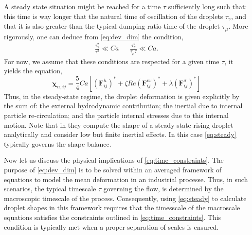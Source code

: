 A steady state situation might be reached for a time $\tau$ sufficiently long such that: this time is way longer that the natural time of oscillation of the droplets $\tau_\gamma$, and that it is also greater than the typical dumping ratio time of the droplet $\tau_\mu$. 
More rigorously, one can deduce from \ref{eq:dev_dim} the condition,
\begin{align}
    \frac{\tau_\gamma^2}{\tau^2}\ll Ca
    && \frac{\tau_\gamma^2}{\tau_\mu \tau}\ll Ca. 
    \label{eq:time_constraints}
\end{align}
For now, we assume that these conditions are respected for a given time $\tau$, it yields the equation, 
\begin{equation}
    \bm\chi_{\alpha,ij}
    =\frac{5  }{4}  Ca [(\textbf{F}_{ij}^h)^*
    + \zeta Re (\textbf{F}_{ij}^{vv})^*
    + \lambda (\textbf{F}_{ij}^{\sigma})^*]
    \label{eq:steady}
\end{equation}
Thus, in the steady-state regime, the droplet deformation is given explicitly by the sum of: the external hydrodynamic contribution; the inertial due to internal particle re-circulation; and the particle internal stresses due to this internal motion. 
Note that in \citet{taylor1964deformation} they compute the shape of a steady state rising droplet analytically and consider low but finite inertial effects. 
In this case \ref{eq:steady} typically governs the shape balance.
 
Now let us discuss the physical implications of \ref{eq:time_constraints}. 
The purpose of \ref{eq:dev_dim} is to be solved within an averaged framework of equations to model the mean deformation in an industrial processe. 
Thus, in such scenarios, the typical timescale $\tau$ governing the flow, is determined by the macroscopic timescale of the process. 
Consequently, using \ref{eq:steady} to calculate droplet shapes in this framework requires that the timesscale of the macroscale equations satisfies the constraints outlined in \ref{eq:time_constraints}.
This condition is typically met when a proper separation of scales is ensured. 

